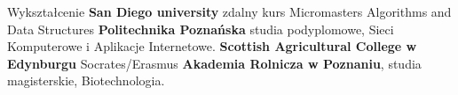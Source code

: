\begin{rubric}{Wykształcenie}
\entry*[2022 -- obecnie]\textbf{San Diego university}
    zdalny kurs Micromasters\newline
    Algorithms and Data Structures
\entry*[2010 -- 2011]\textbf{Politechnika Poznańska}
    studia podyplomowe,\newline
    Sieci Komputerowe i Aplikacje Internetowe.
\entry*[2005]\textbf{Scottish Agricultural College w Edynburgu}\newline
    Socrates/Erasmus
\entry*[2001 -- 2006]\textbf{Akademia Rolnicza w Poznaniu},
    studia magisterskie,\newline
    Biotechnologia.
\end{rubric}
